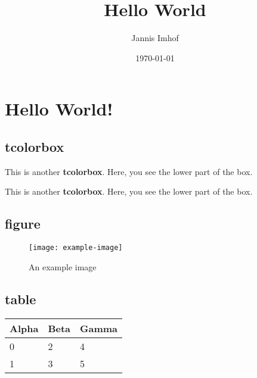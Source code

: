 \documentclass{scrreprt}
\title{Hello World}
\date{\today}
\author{Jannis Imhof}
\begin{document}
\maketitle

\chapter{Hello World!}

\section{tcolorbox}
\begin{tcolorbox}[colback=red!5!white,colframe=red!75!black,title=My nice heading]
This is another \textbf{tcolorbox}.
\tcblower
Here, you see the lower part of the box.
\end{tcolorbox}

\begin{tcolorbox}
This is another \textbf{tcolorbox}.
\tcblower
Here, you see the lower part of the box.
\end{tcolorbox}

\section{figure}
\begin{figure}[!h]
  \texttt{[image: example-image]}
  \caption{An example image}
  \label{fig:example}
\end{figure}

\section{table}

\begin{table}[h]
    \centering
    \begin{tabularx}{\textwidth}{Xll}
        \hline
        Alpha     & Beta     & Gamma     \\ \hline
        0         & 2        & 4         \\ \hline
        1         & 3        & 5         \\ \hline
    \end{tabularx}
\end{table}

\lipsum[2-30]
\end{document}
